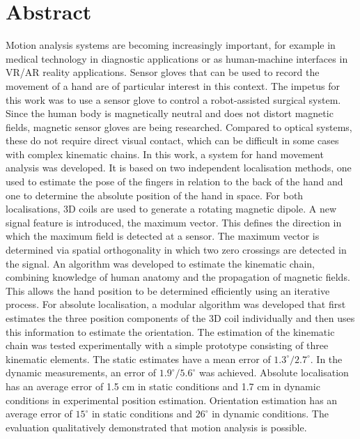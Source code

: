    

\chapter*{Abstract}

Motion analysis systems are becoming increasingly important, for example in medical technology in diagnostic applications or as human-machine interfaces in VR/AR reality applications. Sensor gloves that can be used to record the movement of a hand are of particular interest in this context. The impetus for this work was to use a sensor glove to control a robot-assisted surgical system.
Since the human body is magnetically neutral and does not distort magnetic fields, magnetic sensor gloves are being researched. Compared to optical systems, these do not require direct visual contact, which can be difficult in some cases with complex kinematic chains. 
In this work, a system for hand movement analysis was developed. It is based on two independent localisation methods, one used to estimate the pose of the fingers in relation to the back of the hand and one to determine the absolute position of the hand in space. For both localisations, 3D coils are used to generate a rotating magnetic dipole. A new signal feature is introduced, the maximum vector. This defines the direction in which the maximum field is detected at a sensor. The maximum vector is determined via spatial orthogonality in which two zero crossings are detected in the signal. An algorithm was developed to estimate the kinematic chain, combining knowledge of human anatomy and the propagation of magnetic fields. This allows the hand position to be determined efficiently using an iterative process.
For absolute localisation, a modular algorithm was developed that first estimates the three position components of the 3D coil individually and then uses this information to estimate the orientation. 
The estimation of the kinematic chain was tested experimentally with a simple prototype consisting of three kinematic elements. The static estimates have a mean error of $1.3^\circ/2.7^\circ$. In the dynamic measurements, an error of $1.9^\circ/5.6^\circ$ was achieved. Absolute localisation has an average error of 1.5 cm in static conditions and 1.7 cm in dynamic conditions in experimental position estimation. Orientation estimation has an average error of $15^\circ$ in static conditions and $26^\circ$ in dynamic conditions. The evaluation qualitatively demonstrated that motion analysis is possible.

